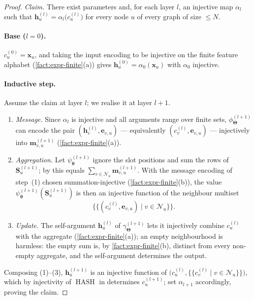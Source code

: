 \begin{proof}
\emph{Claim.} There exist parameters and, for each layer $l$, an injective map
$\alpha_l$ such that $\mathbf{h}_u^{(l)}=\alpha_l\big(c_u^{(l)}\big)$ for every
node $u$ of every graph of size $\le N$.

\paragraph{Base ($l=0$).}
$c_u^{(0)}=\mathbf{x}_u$, and taking the input encoding to be injective on the
finite feature alphabet (\cref{fact:expr-finite}(a)) gives
$\mathbf{h}_u^{(0)}=\alpha_0(\mathbf{x}_u)$ with $\alpha_0$ injective.

\paragraph{Inductive step.}
Assume the claim at layer $l$; we realise it at layer $l+1$.
\begin{enumerate}
  \item[(1)] \emph{Message.} Since $\alpha_l$ is injective and all arguments
        range over finite sets, $\phi_{\bm{\Theta}}^{(l+1)}$ can encode the pair
        $(\mathbf{h}_v^{(l)},\mathbf{e}_{v,u})$ --- equivalently
        $(c_v^{(l)},\mathbf{e}_{v,u})$ --- injectively into
        $\mathbf{m}_{v,u}^{(l+1)}$ (\cref{fact:expr-finite}(a)).
  \item[(2)] \emph{Aggregation.} Let $\psi_{\bm{\theta}}^{(l+1)}$ ignore the slot
        positions and sum the rows of $\mathbf{S}_u^{(l+1)}$; by
         this equals
        $\sum_{v\in\mathcal{N}_u}\mathbf{m}_{v,u}^{(l+1)}$. With the message
        encoding of step~(1) chosen summation-injective
        (\cref{fact:expr-finite}(b)), the value
        $\psi_{\bm{\theta}}^{(l+1)}(\mathbf{S}_u^{(l+1)})$ is then an injective
        function of the neighbour multiset
        \begin{equation*}
          \{\!\{(c_v^{(l)},\mathbf{e}_{v,u})\mid v\in\mathcal{N}_u\}\!\}.
        \end{equation*}
  \item[(3)] \emph{Update.} The self-argument $\mathbf{h}_u^{(l)}$ of
        $\gamma_{\bm{\Theta}}^{(l+1)}$ lets it injectively combine $c_u^{(l)}$
        with the aggregate (\cref{fact:expr-finite}(a)); an empty neighbourhood
        is harmless: the empty sum is, by \cref{fact:expr-finite}(b), distinct
        from every non-empty aggregate, and the self-argument determines the
        output.
\end{enumerate}
Composing (1)--(3), $\mathbf{h}_u^{(l+1)}$ is an injective function of
$\big(c_u^{(l)},\{\!\{c_v^{(l)}\mid v\in\mathcal{N}_u\}\!\}\big)$, which by
injectivity of $\operatorname{HASH}$ in  determines
$c_u^{(l+1)}$; set $\alpha_{l+1}$ accordingly, proving the claim.


\end{proof}
